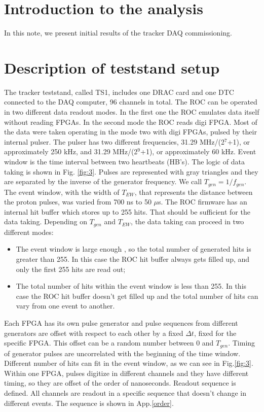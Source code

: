 \section {Introduction to the analysis}

In this note, we present initial results of the tracker DAQ commissioning.
\section{Description of teststand setup}
  The tracker teststand, called TS1, includes one DRAC card and one DTC connected to the DAQ computer, 96 channels in total.
The ROC can be operated in two different data readout modes. In the first one the ROC emulates data itself without reading FPGAs. In the second mode the ROC reads digi FPGA.
 Most of the data were taken operating in the mode two with digi FPGAs, pulsed by their internal pulser.
  The pulser has two different frequencies,  31.29 MHz/(2$^7$+1), or approximately 250 kHz, 
and 31.29 MHz/(2$^9$+1), or approximately 60 kHz.
Event window is the time interval between two heartbeats (HB's). 
The logic of data taking is shown in Fig. \ref{fig:3}.
Pulses are represented with gray triangles and 
they are separated by the inverse of the generator frequency. We call $T_{gen}=1/f_{gen}$.
The event window, with the width of $T_{EW}$, that represents the distance between the proton pulses, 
was varied from 700 ns to 50 $\mu$s. 
The ROC firmware has an internal hit buffer which stores up to 255 hits.
That should be sufficient for the data taking.
Depending on $T_{gen}$ and $T_{EW}$, the data taking can proceed in two different modes:
  \begin{itemize}
  \item
    The event window is large enough , so the total number of generated hits is greater than 255. In this case
    the ROC hit buffer always gets filled up, and only the first 255 hits are read out;
  \item
    The total number of hits within the event window is less than 255.
    In this case the ROC hit buffer doesn't get filled up and the total number of hits can vary from one event to another.
  \end{itemize}
Each FPGA has its own pulse generator and pulse sequences from different generators are offset with respect to each other by a fixed $\Delta t$, fixed for the specific FPGA.
This offset can be a random number between 0 and $T_{gen}$.
Timing of generator pulses are uncorrelated with the beginning of the time window. Different number of hits can fit in the event window, as we can see in Fig.\ref{fig:3}.
Within one FPGA, pulses digitize in different channels and they have different timing, so they are offset of the order of nanoseconds.
Readout sequence is defined. All channels are readout in a specific sequence that doesn't change in different events. The sequence is shown in App.\ref{order}.


